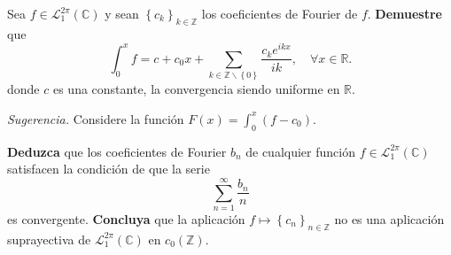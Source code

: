 \documentclass[12pt]{report}
\theoremstyle{largebreak}
\begin{document}
    \begin{excer}
        Sea $f\in\mathcal{L}_1^{2\pi}(\mathbb{C})$ y sean $\left\{c_k \right\}_{ k\in\mathbb{Z}}$ los coeficientes de Fourier de $f$. \textbf{Demuestre} que
        \begin{equation*}
            \int_0^x f=c+c_0x+\sum_{ k\in\mathbb{Z}\backslash\left\{0\right\}}\frac{c_ke^{ ikx}}{ik},\quad\forall x\in\mathbb{R}.
        \end{equation*}
        donde $c$ es una constante, la convergencia siendo uniforme en $\mathbb{R}$.

        \textit{Sugerencia.} Considere la función $F(x)=\int_0^x (f-c_0)$.

        \textbf{Deduzca} que los coeficientes de Fourier $b_n$ de cualquier función $f\in\mathcal{L}_1^{2\pi}(\mathbb{C})$ satisfacen la condición de que la serie
        \begin{equation*}
            \sum_{ n=1}^\infty\frac{b_n}{n}
        \end{equation*}
        es convergente. \textbf{Concluya} que la aplicación $f\mapsto\left\{c_n \right\}_{ n\in\mathbb{Z}}$ no es una aplicación suprayectiva de $\mathcal{L}_1^{2\pi}(\mathbb{C})$ en $c_0(\mathbb{Z})$.
    \end{excer}
\end{document}
